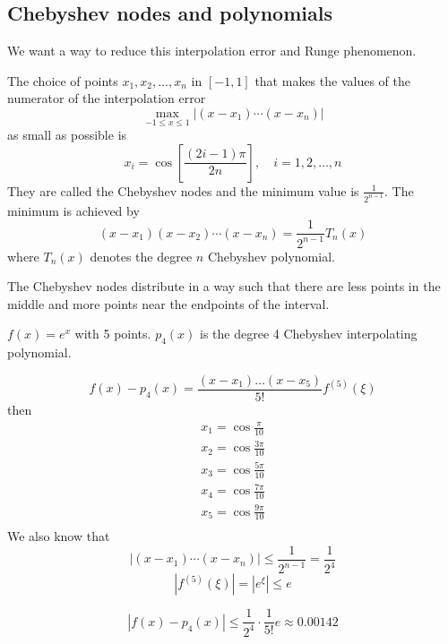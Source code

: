 \documentclass[11pt]{article}
\begin{document}
\subsection{Chebyshev nodes and polynomials}
We want a way to reduce this interpolation error and Runge phenomenon.
\begin{theorem}\label{chebnode}
    The choice of points $x_1, x_2, \dots, x_n$ in $[-1, 1]$ that makes the values of the numerator of the interpolation error
    \[
        \max_{-1 \le x \le 1}|(x-x_1)\cdots (x-x_n)|
    \]
    as small as possible is 
    \[
        x_i = \cos\left[\frac{(2i-1)\pi}{2n} \right], \quad i = 1,2,\dots, n
    \]
    They are called the Chebyshev nodes and the minimum value is $\frac{1}{2^{n-1}}$. The minimum is achieved by
    \[
        (x-x_1)(x-x_2)\cdots(x-x_n) = \frac{1}{2^{n-1}}T_n(x)
    \]
    where $T_n(x)$ denotes the degree $n$ Chebyshev polynomial.
\end{theorem}
\begin{remark}
    The Chebyshev nodes distribute in a way such that there are less points in the middle and more points near the endpoints of the interval.
\end{remark}
\begin{example}
    $f(x) = e^x$ with 5 points. $p_4(x)$ is the degree 4 Chebyshev interpolating polynomial.

    \[
        f(x) - p_4(x) = \frac{(x-x_1)\dots(x-x_5)}{5!}f^{(5)}(\xi)
    \]
    then
    \begin{align*}
        x_1 = \cos \frac{\pi }{10}\\
        x_2 = \cos \frac{3 \pi }{10}\\
        x_3 = \cos \frac{5 \pi}{10}\\
        x_4 =\cos \frac{7 \pi}{10}\\
        x_5 = \cos \frac{9 \pi}{10}\\ 
    \end{align*}
    We also know that 
    \[
        |(x-x_1)\cdots(x-x_n)| \le \frac{1}{2^{n-1}} = \frac{1}{2^4}
    \]
    \[
        |f^{(5)}(\xi)| = |e^\xi| \le e
    \]
    
    \[
        |f(x) - p_4(x)| \le \frac{1}{2^4}\cdot \frac{1}{5!}e \approx 0.00142
    \]
    
\end{example}
\end{document}

